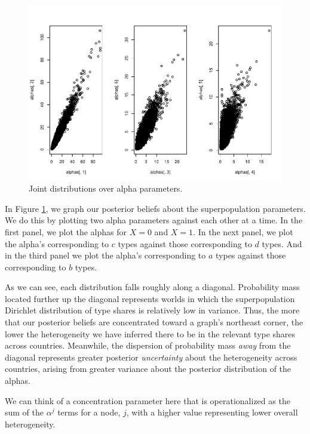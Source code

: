 \documentclass[
  12pt,
]{book}
\begin{document}
\begin{figure}
\centering
\includegraphics{ii_files/figure-latex/plotalphas-1.pdf}
\caption{\label{fig:plotalphas}Joint distributions over alpha parameters.}
\end{figure}

In Figure \ref{fig:plotalphas}, we graph our posterior beliefs about the superpopulation parameters. We do this by plotting two alpha parameters against each other at a time. In the first panel, we plot the alphas for \(X=0\) and \(X=1\). In the next panel, we plot the alpha's corresponding to \(c\) types against those corresponding to \(d\) types. And in the third panel we plot the alpha's corresponding to \(a\) types against those corresponding to \(b\) types.

As we can see, each distribution falls roughly along a diagonal. Probability mass located further up the diagonal represents worlds in which the superpopulation Dirichlet distribution of type shares is relatively low in variance. Thus, the more that our posterior beliefs are concentrated toward a graph's northeast corner, the lower the heterogeneity we have inferred there to be in the relevant type shares across countries. Meanwhile, the dispersion of probability mass \emph{away} from the diagonal represents greater posterior \emph{uncertainty} about the heterogeneity across countries, arising from greater variance about the posterior distribution of the alphas.

We can think of a concentration parameter here that is operationalized as the sum of the \(\alpha^j\) terms for a node, \(j\), with a higher value representing lower overall heterogeneity.
\end{document}
